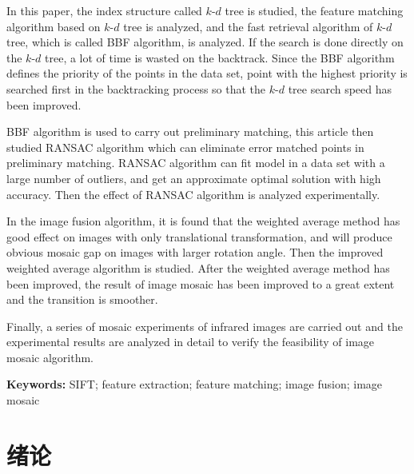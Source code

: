 \documentclass[10.5pt,a4paper]{article}
\numberwithin{equation}{section}
\numberwithin{figure}{section}
\numberwithin{table}{section}
\renewcommand{\headrulewidth}{0pt}
\begin{document}
In this paper, the index structure called $k\text{-}d$ tree is studied, the feature matching algorithm based on $k\text{-}d$ tree is analyzed, and the fast retrieval algorithm of $k\text{-}d$ tree, which is called BBF algorithm, is analyzed.
If the search is done directly on the $k\text{-}d$ tree, a lot of time is wasted on the backtrack. Since the BBF algorithm defines the priority of the points in the data set, point with the highest priority is searched first in the backtracking process so that the $k\text{-}d$ tree search speed has been improved.\par
BBF algorithm is used to carry out preliminary matching, this article then studied RANSAC algorithm which can eliminate error matched points in preliminary matching.
RANSAC algorithm can fit model in a data set with a large number of outliers, and get an approximate optimal solution with high accuracy.
Then the effect of RANSAC algorithm is analyzed experimentally.
\par
In the image fusion algorithm, it is found that the weighted average method has good effect on images with only translational transformation,
and will produce obvious mosaic gap on images with larger rotation angle. Then the improved weighted average algorithm is studied.
After the weighted average method has been improved, the result of image mosaic has been improved to a great extent and the transition is smoother.
\par
Finally, a series of mosaic experiments of infrared images are carried out and the experimental results are analyzed in detail to verify the feasibility of image mosaic algorithm.
\vspace{2em}
\par
\noindent \textbf{Keywords:} SIFT; feature extraction; feature matching; image fusion; image mosaic
\newpage
{}
{}
\tableofcontents
\newpage
{}
{}
\tableofengcontents
\newpage %
\pagestyle{fancy}
\fancyhf{}
\fancyhead[C]{\fontsize{10.5pt}{\baselineskip}\selectfont \leftmark}
\fancyfoot[C]{\fontsize{9pt}{\baselineskip}\selectfont\thepage}
\renewcommand{\headrulewidth}{0.5pt}
\setcounter{page}{1}
\fontsize{12pt}{16pt}\selectfont
\section{绪论\label{sectionXulun}}
\end{document}
